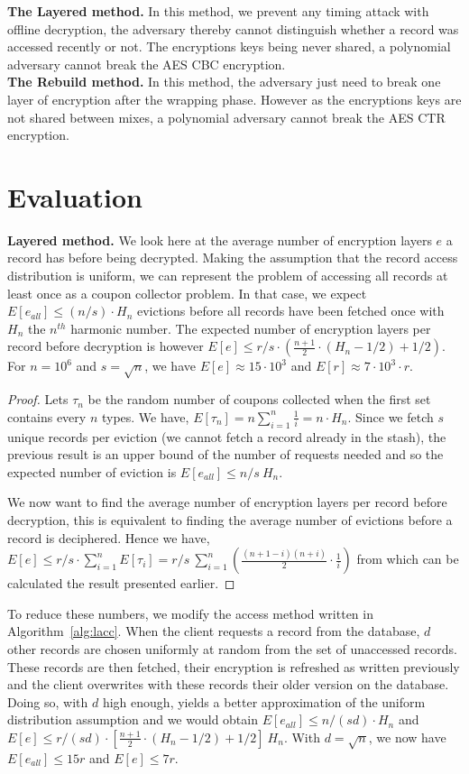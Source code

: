 \documentclass[USenglish,oneside,twocolumn]{article}
\begin{document}
\noindent\textbf{The Layered method.}
In this method, we prevent any timing attack with offline decryption, the adversary thereby cannot distinguish whether a record was accessed recently or not. The encryptions keys being never shared, a polynomial adversary cannot break the AES CBC encryption.\\

\noindent\textbf{The Rebuild method.}
In this method, the adversary just need to break one layer of encryption after the wrapping phase. However as the encryptions keys are not shared between mixes, a polynomial adversary cannot break the AES CTR encryption.

\section{Evaluation}\label{Evaluation}
\textbf{Layered method.} We look here at the average number of encryption layers $e$ a record has before being decrypted. Making the assumption that the record access distribution is uniform, we can represent the problem of accessing all records at least once as a coupon collector problem. In that case, we expect $E[e_{all}]\leq(n/s)\cdot H_n$ evictions before all records have been fetched once with $H_n$ the $n^{th}$ harmonic number. The expected number of encryption layers per record before decryption is however $E[e]\leq{r/s} \cdot \left ( \frac{n+1}{2}\cdot(H_n-1/2)+1/2 \right )$. For $n=10^6$ and $s=\sqrt{n}$, we have $E[e]\approx 15 \cdot 10^3$ and $E[r]\approx 7\cdot 10^3 \cdot r$.
\begin{proof}
Lets $\tau_n$ be the random number of coupons collected when the first set contains every $n$ types. We have, $E[\tau_n]=n\sum_{i=1}^n \frac{1}{i} = n \cdot H_n$.
Since we fetch $s$ unique records per eviction (we cannot fetch a record already in the stash), the previous result is an upper bound of the number of requests needed and so the expected number of eviction is $E[e_{all}]\leq n/s\ H_n$.

We now want to find the average number of encryption layers per record before decryption, this is equivalent to finding the average number of evictions before a record is deciphered. 
Hence we have, $E[e]\leq r/s \cdot \sum_{i=1}^n E[\tau_i] = r/s\ \sum_{i=1}^n \left (\frac{(n+1-i)(n+i)}{2}\cdot \frac{1}{i}\right )$ from which can be calculated the result presented earlier. 
\end{proof}

To reduce these numbers, we modify the access method written in Algorithm~\ref{alg:lacc}. When the client requests a record from the database, $d$ other records are chosen uniformly at random from the set of unaccessed records. These records are then fetched, their encryption is refreshed as written previously and the client overwrites with these records their older version on the database. Doing so, with $d$ high enough, yields a better approximation of the uniform distribution assumption and we would obtain  $E[e_{all}]\leq n/(sd) \cdot H_n $ and $E[e] \leq {r/(sd)} \cdot \left [ \frac{n+1}{2}\cdot(H_n-1/2)+1/2 \right ] \ H_n$.
With $d=\sqrt n$, we now have $E[e_{all}]\leq 15 r$ and $E[e]\leq 7r$.
\end{document}
